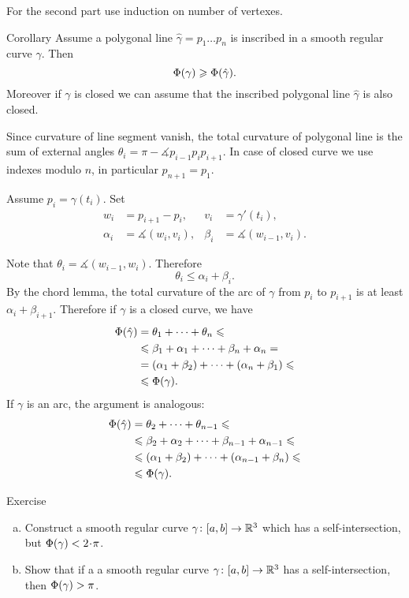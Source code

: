  For the second part use induction on number of vertexes.


\begin{thm}{Corollary}\label{cor:inscribed-total-curvature}
Assume a polygonal line $\hat\gamma=p_1\dots p_n$ is inscribed in a smooth regular curve $\gamma$.
Then 
\[\Phi({\gamma})\geqslant \Phi({\hat\gamma}).\]
Moreover if $\gamma$ is closed we can assume that the inscribed polygonal line $\hat\gamma$ is also closed.

\end{thm}

Since curvature of line segment vanish, 
the total curvature of polygonal line is the sum of external angles $\theta_i=\pi-\measuredangle p_{i-1}p_ip_{i+1}$.
In case of closed curve we use indexes modulo $n$, in particular $p_{n+1}=p_1$.

Assume $p_i=\gamma(t_i)$.
Set 
\begin{align*}
w_i&=p_{i+1}-p_i,& v_i&=\gamma'(t_i),
\\
\alpha_i&=\measuredangle (w_i,v_i),&\beta_i&=\measuredangle (w_{i-1},v_i).
\end{align*}


Note that $\theta_i=\measuredangle (w_{i-1},w_i)$.
Therefore 
\[\theta_i\le \alpha_i+\beta_i.\]
By the chord lemma, the total curvature of the arc of $\gamma$ from $p_i$ to $p_{i+1}$ is at least $\alpha_i+\beta_{i+1}$. 
Therefore if $\gamma$ is a closed curve, we have
\begin{align*}
\Phi({\hat\gamma})&=\theta_1+\dots+\theta_n\leqslant 
\\
&\leqslant\beta_1+\alpha_1+\dots+\beta_n+\alpha_n = 
\\
&=(\alpha_1+\beta_2)+\dots+(\alpha_n+\beta_1) \leqslant 
\\
&\leqslant \Phi({\gamma}).
\end{align*}
If $\gamma$ is an arc, the argument is analogous:
\begin{align*}
\Phi({\hat\gamma})&=\theta_2+\dots+\theta_{n-1}\leqslant 
\\
&\leqslant\beta_2+\alpha_2+\dots+\beta_{n-1}+\alpha_{n-1} \leqslant
\\
&\leqslant (\alpha_1+\beta_2)+\dots+(\alpha_{n-1}+\beta_n) \leqslant 
\\
&\leqslant \Phi({\gamma}).
\end{align*}
\qedsf

\begin{thm}{Exercise}
\begin{enumerate}[(a)]
\item Construct a smooth regular curve $\gamma\colon[a,b]\to\mathbb{R}^3$ which has a self-intersection, but $\tc\gamma<2\cdot\pi$.
\item Show that if a a smooth regular curve $\gamma\colon[a,b]\to\mathbb{R}^3$ has a self-intersection, then $\Phi({\gamma})>\pi$.
\end{enumerate}
\end{thm}


